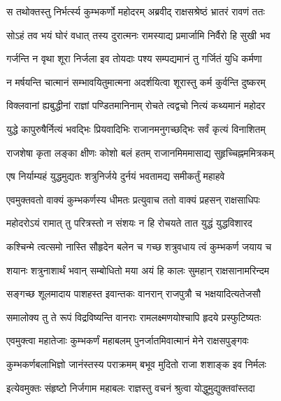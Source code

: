
\twolineshloka
{स तथोक्तस्तु निर्भर्त्स्य कुम्भकर्णो महोदरम्}
{अब्रवीद् राक्षसश्रेष्ठं भ्रातरं रावणं ततः} %

\twolineshloka
{सोऽहं तव भयं घोरं वधात् तस्य दुरात्मनः}
{रामस्याद्य प्रमार्जामि निर्वैरो हि सुखी भव} %

\twolineshloka
{गर्जन्ति न वृथा शूरा निर्जला इव तोयदाः}
{पश्य सम्पद्यमानं तु गर्जितं युधि कर्मणा} %

\twolineshloka
{न मर्षयन्ति चात्मानं सम्भावयितुमात्मना}
{अदर्शयित्वा शूरास्तु कर्म कुर्वन्ति दुष्करम्} %

\twolineshloka
{विक्लवानां ह्यबुद्धीनां राज्ञां पण्डितमानिनाम्}
{रोचते त्वद्वचो नित्यं कथ्यमानं महोदर} %

\twolineshloka
{युद्धे कापुरुषैर्नित्यं भवद्भिः प्रियवादिभिः}
{राजानमनुगच्छद्भिः सर्वं कृत्यं विनाशितम्} %

\twolineshloka
{राजशेषा कृता लङ्का क्षीणः कोशो बलं हतम्}
{राजानमिममासाद्य सुहृच्चिह्नममित्रकम्} %

\twolineshloka
{एष निर्याम्यहं युद्धमुद्यतः शत्रुनिर्जये}
{दुर्नयं भवतामद्य समीकर्तुं महाहवे} %

\twolineshloka
{एवमुक्तवतो वाक्यं कुम्भकर्णस्य धीमतः}
{प्रत्युवाच ततो वाक्यं प्रहसन् राक्षसाधिपः} %

\twolineshloka
{महोदरोऽयं रामात् तु परित्रस्तो न संशयः}
{न हि रोचयते तात युद्धं युद्धविशारद} %

\twolineshloka
{कश्चिन्मे त्वत्समो नास्ति सौहृदेन बलेन च}
{गच्छ शत्रुवधाय त्वं कुम्भकर्ण जयाय च} %

\twolineshloka
{शयानः शत्रुनाशार्थं भवान् सम्बोधितो मया}
{अयं हि कालः सुमहान् राक्षसानामरिन्दम} %

\twolineshloka
{सङ्गच्छ शूलमादाय पाशहस्त इवान्तकः}
{वानरान् राजपुत्रौ च भक्षयादित्यतेजसौ} %

\twolineshloka
{समालोक्य तु ते रूपं विद्रविष्यन्ति वानराः}
{रामलक्ष्मणयोश्चापि हृदये प्रस्फुटिष्यतः} %

\twolineshloka
{एवमुक्त्वा महातेजाः कुम्भकर्णं महाबलम्}
{पुनर्जातमिवात्मानं मेने राक्षसपुङ्गवः} %

\twolineshloka
{कुम्भकर्णबलाभिज्ञो जानंस्तस्य पराक्रमम्}
{बभूव मुदितो राजा शशाङ्क इव निर्मलः} %

\twolineshloka
{इत्येवमुक्तः संहृष्टो निर्जगाम महाबलः}
{राज्ञस्तु वचनं श्रुत्वा योद्धुमुद्युक्तवांस्तदा} %

